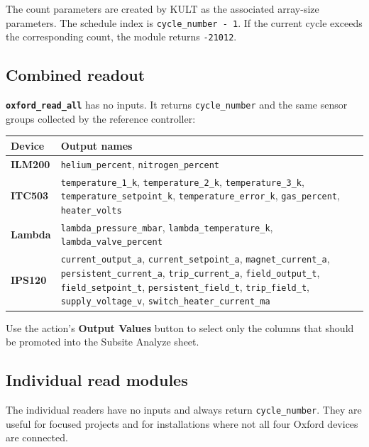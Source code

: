 \documentclass[10pt,a4paper]{article}
\newcommand{\api}[1]{\nolinkurl{#1}}
\newcommand{\module}[1]{\textcolor{OxfordBlue}{\textbf{\api{#1}}}}
\begin{document}
The count parameters are created by KULT as the associated array-size
parameters. The schedule index is \api{cycle_number - 1}. If the current cycle
exceeds the corresponding count, the module returns \api{-21012}.

\subsection{Combined readout}

\module{oxford_read_all} has no inputs. It returns \api{cycle_number} and the
same sensor groups collected by the reference controller:

\begin{longtable}{@{}>{\bfseries\color{OxfordDark}}p{}
                        >{\raggedright\arraybackslash}p{}@{}}
\toprule
\textbf{Device} & \textbf{Output names} \\
\midrule
\endhead
ILM200 &
\api{helium_percent}, \api{nitrogen_percent} \\
ITC503 &
\api{temperature_1_k}, \api{temperature_2_k}, \api{temperature_3_k},
\api{temperature_setpoint_k}, \api{temperature_error_k},
\api{gas_percent}, \api{heater_volts} \\
Lambda &
\api{lambda_pressure_mbar}, \api{lambda_temperature_k},
\api{lambda_valve_percent} \\
IPS120 &
\api{current_output_a}, \api{current_setpoint_a},
\api{magnet_current_a}, \api{persistent_current_a}, \api{trip_current_a},
\api{field_output_t}, \api{field_setpoint_t}, \api{persistent_field_t},
\api{trip_field_t}, \api{supply_voltage_v},
\api{switch_heater_current_ma} \\
\bottomrule
\end{longtable}

Use the action's \textbf{Output Values} button to select only the columns that
should be promoted into the Subsite Analyze sheet.

\subsection{Individual read modules}

The individual readers have no inputs and always return \api{cycle_number}.
They are useful for focused projects and for installations where not all four
Oxford devices are connected.
\end{document}
